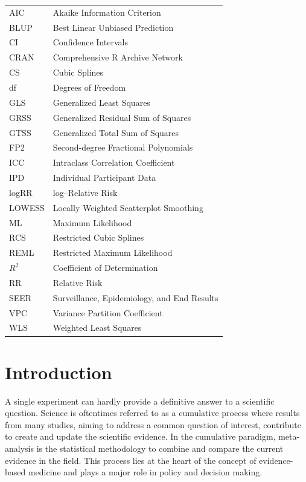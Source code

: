 \documentclass[11pt,a4paper,twoside,openany]{book}\usepackage{knitr}
\begin{document}
{{\begin{tabular}{ll}
AIC & Akaike Information Criterion \\
BLUP & Best Linear Unbiased Prediction \\
CI & Confidence Intervals \\
CRAN & Comprehensive R Archive Network \\
CS & Cubic Splines \\
df & Degrees of Freedom \\
GLS & Generalized Least Squares \\
GRSS & Generalized Residual Sum of Squares \\
GTSS & Generalized Total Sum of Squares \\
FP2 & Second-degree Fractional Polynomials \\
ICC & Intraclass Correlation Coefficient \\
IPD & Individual Participant Data \\
logRR & log--Relative Risk \\
LOWESS & Locally Weighted Scatterplot Smoothing \\
ML & Maximum Likelihood \\
RCS & Restricted Cubic Splines \\
REML & Restricted Maximum Likelihood \\
$R^2$ & Coefficient of Determination \\
RR & Relative Risk \\
SEER & Surveillance, Epidemiology, and End Results \\
VPC & Variance Partition Coefficient \\
WLS & Weighted Least Squares


\end{tabular}

\mainmatter
\pagestyle{mainmatter}



%

\chapter{Introduction}

A single experiment can hardly provide a definitive answer to a scientific question. Science is oftentimes referred to as a cumulative process where results from many studies, aiming to address a common question of interest, contribute to create and update the scientific evidence. In the cumulative paradigm, meta-analysis is the statistical methodology to combine and compare the current evidence in the field. This process lies at the heart of the concept of evidence-based medicine and plays a major role in policy and decision making.

}}
\end{document}
